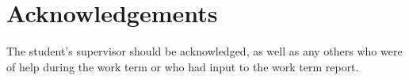 \section*{Acknowledgements}

The student's supervisor should be acknowledged, as well as any others who were of help during the work term or who had input to the work term report.
